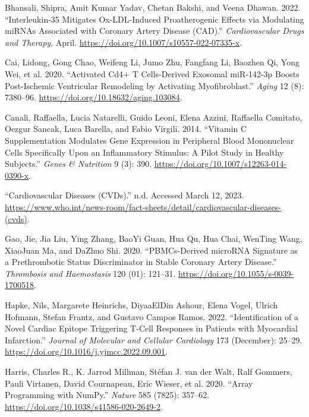 \documentclass[smallextended]{svjour3}       %
\newlength{\cslhangindent}
\newlength{\cslentryspacingunit} %
\newenvironment{CSLReferences}[2] %
 {%
  \setlength{\parindent}{0pt}
  \ifodd #1
  \let\oldpar\par
  \def\par{\hangindent=\cslhangindent\oldpar}
  \fi
  \setlength{\parskip}{#2\cslentryspacingunit}
 }%
 {}
\begin{document}
\hypertarget{refs}{}
\begin{CSLReferences}{1}{0}
\leavevmode{}%
Bhansali, Shipra, Amit Kumar Yadav, Chetan Bakshi, and Veena Dhawan.
2022. {``Interleukin-35 {Mitigates} Ox-{LDL}-{Induced} {Proatherogenic}
{Effects} via {Modulating} {miRNAs} {Associated} with {Coronary}
{Artery} {Disease} ({CAD}).''} \emph{Cardiovascular Drugs and Therapy},
April. \url{https://doi.org/10.1007/s10557-022-07335-x}.

\leavevmode{}%
Cai, Lidong, Gong Chao, Weifeng Li, Jumo Zhu, Fangfang Li, Baozhen Qi,
Yong Wei, et al. 2020. {``Activated {Cd4}+ {T} Cells-Derived Exosomal
{miR}-142-3p Boosts Post-Ischemic Ventricular Remodeling by Activating
Myofibroblast.''} \emph{Aging} 12 (8): 7380--96.
\url{https://doi.org/10.18632/aging.103084}.

\leavevmode{}%
Canali, Raffaella, Lucia Natarelli, Guido Leoni, Elena Azzini, Raffaella
Comitato, Oezgur Sancak, Luca Barella, and Fabio Virgili. 2014.
{``Vitamin {C} Supplementation Modulates Gene Expression in Peripheral
Blood Mononuclear Cells Specifically Upon an Inflammatory Stimulus: A
Pilot Study in Healthy Subjects.''} \emph{Genes \& Nutrition} 9 (3):
390. \url{https://doi.org/10.1007/s12263-014-0390-x}.

\leavevmode{}%
{``Cardiovascular Diseases ({CVDs}).''} n.d. Accessed March 12, 2023.
\url{https://www.who.int/news-room/fact-sheets/detail/cardiovascular-diseases-(cvds)}.

\leavevmode{}%
Gao, Jie, Jia Liu, Ying Zhang, BaoYi Guan, Hua Qu, Hua Chai, WenTing
Wang, XiaoJuan Ma, and DaZhuo Shi. 2020. {``{PBMCs}-{Derived} {microRNA}
{Signature} as a {Prethrombotic} {Status} {Discriminator} in {Stable}
{Coronary} {Artery} {Disease}.''} \emph{Thrombosis and Haemostasis} 120
(01): 121--31. \url{https://doi.org/10.1055/s-0039-1700518}.

\leavevmode{}%
Hapke, Nils, Margarete Heinrichs, DiyaaElDin Ashour, Elena Vogel, Ulrich
Hofmann, Stefan Frantz, and Gustavo Campos Ramos. 2022.
{``Identification of a Novel Cardiac Epitope Triggering {T}-Cell
Responses in Patients with Myocardial Infarction.''} \emph{Journal of
Molecular and Cellular Cardiology} 173 (December): 25--29.
\url{https://doi.org/10.1016/j.yjmcc.2022.09.001}.

\leavevmode{}%
Harris, Charles R., K. Jarrod Millman, Stéfan J. van der Walt, Ralf
Gommers, Pauli Virtanen, David Cournapeau, Eric Wieser, et al. 2020.
{``Array Programming with {NumPy}.''} \emph{Nature} 585 (7825): 357--62.
\url{https://doi.org/10.1038/s41586-020-2649-2}.


\end{CSLReferences}
\end{document}
